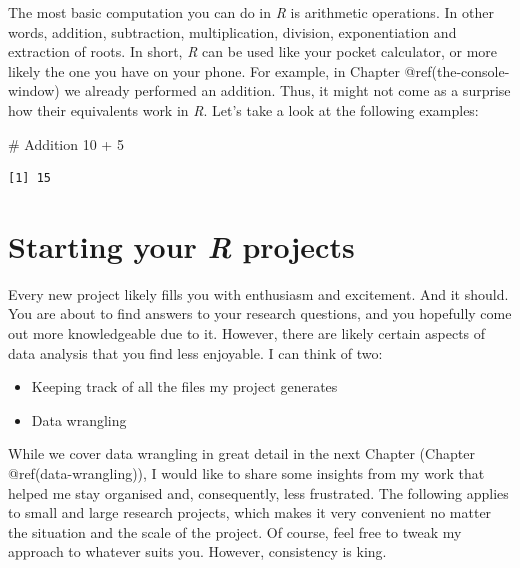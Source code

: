 \documentclass[
  letterpaper,
]{krantz}
\makeatletter
\newenvironment{Shaded}{\begin{snugshade}}{\end{snugshade}}
\newcommand{\CommentTok}[1]{\textcolor[rgb]{0.37,0.37,0.37}{#1}}
\newcommand{\DecValTok}[1]{\textcolor[rgb]{0.68,0.00,0.00}{#1}}
\newcommand{\SpecialCharTok}[1]{\textcolor[rgb]{0.37,0.37,0.37}{#1}}
\newenvironment{kframe}{%
\medskip{}
\setlength{\fboxsep}{.8em}
 \def\at@end@of@kframe{}%
 \ifinner\ifhmode%
  \def\at@end@of@kframe{\end{minipage}}%
  \begin{minipage}{\columnwidth}%
 \fi\fi%
 \def\FrameCommand##1{\hskip\@totalleftmargin \hskip-\fboxsep
 \colorbox{shadecolor}{##1}\hskip-\fboxsep
     \hskip-\linewidth \hskip-\@totalleftmargin \hskip\columnwidth}%
 \MakeFramed {\advance\hsize-\width
   \@totalleftmargin\z@ \linewidth\hsize
   \@setminipage}}%
 {\par\unskip\endMakeFramed%
 \at@end@of@kframe}
\renewenvironment{Shaded}{\begin{kframe}}{\end{kframe}}
\makeatother
\begin{document}
The most basic computation you can do in \emph{R} is arithmetic
operations. In other words, addition, subtraction, multiplication,
division, exponentiation and extraction of roots. In short, \emph{R} can
be used like your pocket calculator, or more likely the one you have on
your phone. For example, in Chapter @ref(the-console-window) we already
performed an addition. Thus, it might not come as a surprise how their
equivalents work in \emph{R}. Let's take a look at the following
examples:

\begin{Shaded}
\begin{Highlighting}[]
\CommentTok{\# Addition}
\DecValTok{10} \SpecialCharTok{+} \DecValTok{5}
\end{Highlighting}
\end{Shaded}

\begin{verbatim}
[1] 15
\end{verbatim}


\chapter{\texorpdfstring{Starting your \emph{R}
projects}{Starting your R projects}}\label{starting-your-r-projects}

Every new project likely fills you with enthusiasm and excitement. And
it should. You are about to find answers to your research questions, and
you hopefully come out more knowledgeable due to it. However, there are
likely certain aspects of data analysis that you find less enjoyable. I
can think of two:

\begin{itemize}
\item
  Keeping track of all the files my project generates
\item
  Data wrangling
\end{itemize}

While we cover data wrangling in great detail in the next Chapter
(Chapter @ref(data-wrangling)), I would like to share some insights from
my work that helped me stay organised and, consequently, less
frustrated. The following applies to small and large research projects,
which makes it very convenient no matter the situation and the scale of
the project. Of course, feel free to tweak my approach to whatever suits
you. However, consistency is king.

\end{document}
